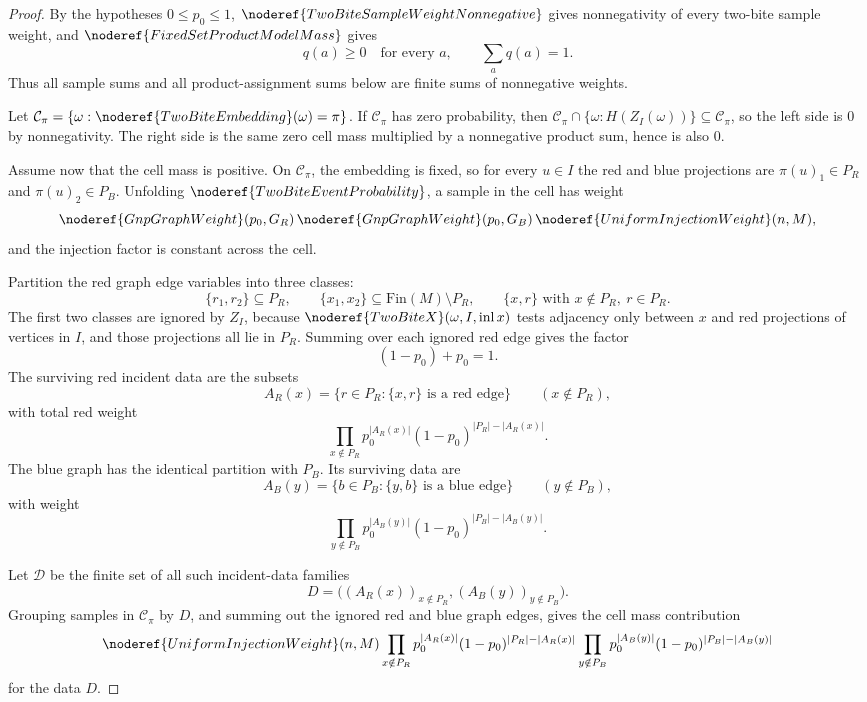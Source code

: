 \begin{proof}
By the hypotheses \(0\le p_0\le1\),
\(\noderef{TwoBiteSampleWeightNonnegative}\) gives nonnegativity of every
two-bite sample weight, and \(\noderef{FixedSetProductModelMass}\) gives
\[
q(a)\ge0\quad\text{for every }a,\qquad \sum_a q(a)=1.
\]
Thus all sample sums and all product-assignment sums below are finite sums of
nonnegative weights.

Let \(\mathcal C_\pi=\{\omega:\noderef{TwoBiteEmbedding}(\omega)=\pi\}\).
If \(\mathcal C_\pi\) has zero probability, then
\(\mathcal C_\pi\cap\{\omega:H(Z_I(\omega))\}\subseteq\mathcal C_\pi\), so
the left side is \(0\) by nonnegativity.  The right side is the same zero cell
mass multiplied by a nonnegative product sum, hence is also \(0\).

Assume now that the cell mass is positive.  On \(\mathcal C_\pi\), the
embedding is fixed, so for every \(u\in I\) the red and blue projections are
\(\pi(u)_1\in P_R\) and \(\pi(u)_2\in P_B\).  Unfolding
\(\noderef{TwoBiteEventProbability}\), a sample in the cell has weight
\[
\noderef{GnpGraphWeight}(p_0,G_R)\,
\noderef{GnpGraphWeight}(p_0,G_B)\,
\noderef{UniformInjectionWeight}(n,M),
\]
and the injection factor is constant across the cell.

Partition the red graph edge variables into three classes:
\[
\{r_1,r_2\}\subseteq P_R,\qquad
\{x_1,x_2\}\subseteq \mathrm{Fin}(M)\setminus P_R,\qquad
\{x,r\}\text{ with }x\notin P_R,\ r\in P_R.
\]
The first two classes are ignored by \(Z_I\), because
\(\noderef{TwoBiteX}(\omega,I,\operatorname{inl}x)\) tests adjacency only
between \(x\) and red projections of vertices in \(I\), and those projections
all lie in \(P_R\).  Summing over each ignored red edge gives the factor
\[
(1-p_0)+p_0=1.
\]
The surviving red incident data are the subsets
\[
A_R(x)=\{r\in P_R:\{x,r\}\text{ is a red edge}\}
\qquad(x\notin P_R),
\]
with total red weight
\[
\prod_{x\notin P_R}
p_0^{|A_R(x)|}(1-p_0)^{|P_R|-|A_R(x)|}.
\]
The blue graph has the identical partition with \(P_B\).  Its surviving data
are
\[
A_B(y)=\{b\in P_B:\{y,b\}\text{ is a blue edge}\}
\qquad(y\notin P_B),
\]
with weight
\[
\prod_{y\notin P_B}
p_0^{|A_B(y)|}(1-p_0)^{|P_B|-|A_B(y)|}.
\]

Let \(\mathcal D\) be the finite set of all such incident-data families
\[
D=\bigl((A_R(x))_{x\notin P_R},(A_B(y))_{y\notin P_B}\bigr).
\]
Grouping samples in \(\mathcal C_\pi\) by \(D\), and summing out the ignored
red and blue graph edges, gives the cell mass contribution
\[
\noderef{UniformInjectionWeight}(n,M)
\prod_{x\notin P_R}
p_0^{|A_R(x)|}(1-p_0)^{|P_R|-|A_R(x)|}
\prod_{y\notin P_B}
p_0^{|A_B(y)|}(1-p_0)^{|P_B|-|A_B(y)|}
\]
for the data \(D\).


\end{proof}
